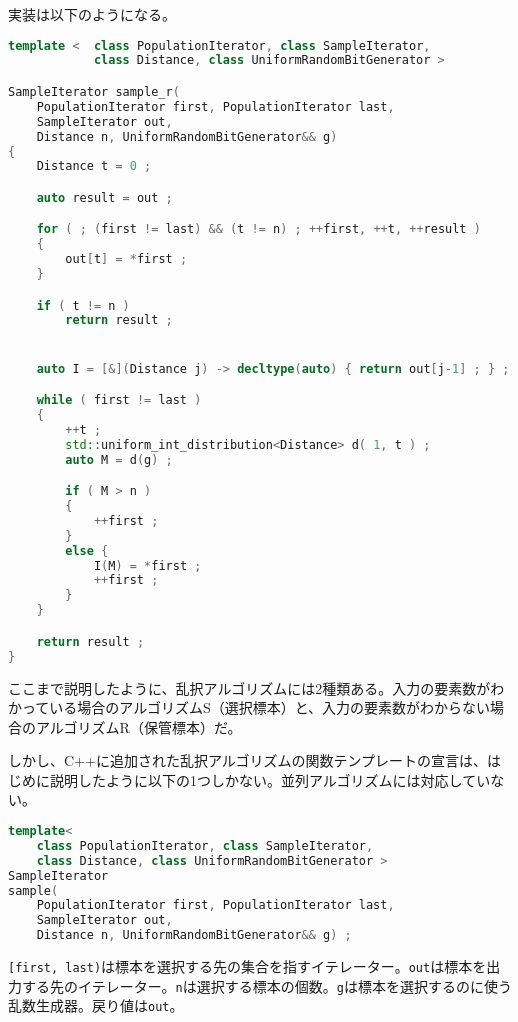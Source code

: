 実装は以下のようになる。

\begin{lstlisting}[language=C++]
template <  class PopulationIterator, class SampleIterator,
            class Distance, class UniformRandomBitGenerator >

SampleIterator sample_r(
    PopulationIterator first, PopulationIterator last,
    SampleIterator out,
    Distance n, UniformRandomBitGenerator&& g)
{
    Distance t = 0 ;

    auto result = out ;

    for ( ; (first != last) && (t != n) ; ++first, ++t, ++result )
    {
        out[t] = *first ;
    }

    if ( t != n )
        return result ;


    auto I = [&](Distance j) -> decltype(auto) { return out[j-1] ; } ;

    while ( first != last )
    {
        ++t ;
        std::uniform_int_distribution<Distance> d( 1, t ) ;
        auto M = d(g) ;

        if ( M > n )
        {
            ++first ;
        }
        else {
            I(M) = *first ;
            ++first ;
        }
    }

    return result ;
}
\end{lstlisting}

%

ここまで説明したように、乱択アルゴリズムには2種類ある。入力の要素数がわかっている場合のアルゴリズムS（選択標本）と、入力の要素数がわからない場合のアルゴリズムR（保管標本）だ。

しかし、C++に追加された乱択アルゴリズムの関数テンプレートの宣言は、はじめに説明したように以下の1つしかない。並列アルゴリズムには対応していない。

\begin{lstlisting}[language=C++]
template<
    class PopulationIterator, class SampleIterator,
    class Distance, class UniformRandomBitGenerator >
SampleIterator
sample(
    PopulationIterator first, PopulationIterator last,
    SampleIterator out,
    Distance n, UniformRandomBitGenerator&& g) ;
\end{lstlisting}

\lstinline![first, last)!は標本を選択する先の集合を指すイテレーター。\lstinline!out!は標本を出力する先のイテレーター。\lstinline!n!は選択する標本の個数。\lstinline!g!は標本を選択するのに使う乱数生成器。戻り値は\lstinline!out!。

